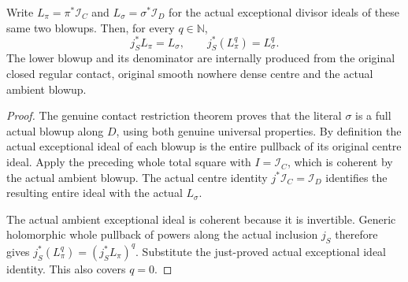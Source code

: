 \begin{theorem}
\label{hir:actual-closed-contact-exceptional-denominator-restriction}
\leanok
Write $L_\pi=\pi^*\mathcal I_C$ and
$L_\sigma=\sigma^*\mathcal I_D$ for the actual exceptional divisor
ideals of these same two blowups. Then, for every $q\in\mathbb N$,
\[
 j_S^*L_\pi=L_\sigma,\qquad j_S^*(L_\pi^q)=L_\sigma^q.
\]
The lower blowup and its denominator are internally produced from the
original closed regular contact, original smooth nowhere dense centre
and the actual ambient blowup.
\end{theorem}
\begin{proof}
The genuine contact restriction theorem proves that the literal
$\sigma$ is a full actual blowup along $D$, using both genuine
universal properties. By definition the actual exceptional ideal of
each blowup is the entire pullback of its original centre ideal.
Apply the preceding whole total square with $I=\mathcal I_C$, which
is coherent by the actual ambient blowup. The actual centre identity
$j^*\mathcal I_C=\mathcal I_D$ identifies the resulting entire ideal
with the actual $L_\sigma$.

The actual ambient exceptional ideal is coherent because it is
invertible. Generic holomorphic whole pullback of powers along the
actual inclusion $j_S$ therefore gives
$j_S^*(L_\pi^q)=(j_S^*L_\pi)^q$. Substitute the just-proved actual
exceptional ideal identity. This also covers $q=0$.
\end{proof}

